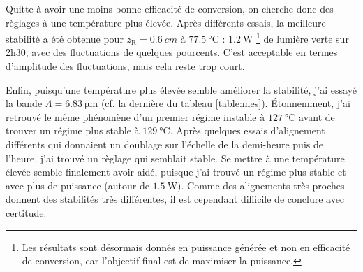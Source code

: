 \documentclass[11pt,a4paper]{article}
\newcommand{\zr}{z_\mathsc{R}}
\newcommand{\mathsc}[1]{\mathrm{\scriptscriptstyle {#1}}}
\begin{document}
Quitte à avoir une moins bonne efficacité de conversion, on cherche donc des règlages à une température plus élevée. Après différents essais, la meilleure stabilité a été obtenue pour $\zr=\SI{0.6}{cm}$ à $\SI{77.5}{\celsius}$ : $\SI{1.2}{\watt}$ \footnote{Les résultats sont désormais donnés en puissance générée et non en efficacité de conversion, car l'objectif final est de maximiser la puissance.} de lumière verte sur 2h30, avec des fluctuations de quelques pourcents. C'est acceptable en termes d'amplitude des fluctuations, mais cela reste trop court. 

Enfin, puisqu'une température plus élevée semble améliorer la stabilité, j'ai essayé la bande $\Lambda=\SI{6.83}{\micro\meter}$ (cf. la dernière du tableau \ref{table:mes}). Étonnemment, j'ai retrouvé le même phénomène d'un premier régime instable à $\SI{127}{\celsius}$ avant de trouver un régime plus stable à $\SI{129}{\celsius}$. Après quelques essais d'alignement différents qui donnaient un doublage sur l'échelle de la demi-heure puis de l'heure, j'ai trouvé un règlage qui semblait stable. Se mettre à une température élevée semble finalement avoir aidé, puisque j'ai trouvé un régime plus stable et avec plus de puissance (autour de $\SI{1.5}{\watt}$). Comme des alignements très proches donnent des stabilités très différentes, il est cependant difficile de conclure avec certitude.
\end{document}
